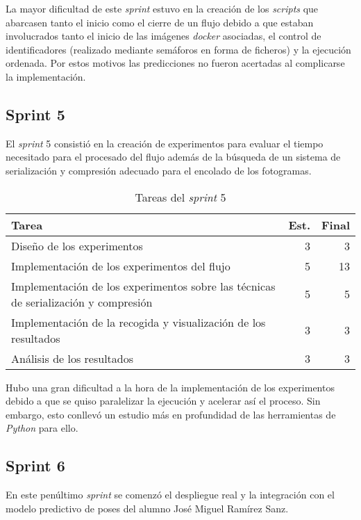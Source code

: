 La mayor dificultad de este \textit{sprint} estuvo en la creación de los \textit{scripts} que abarcasen tanto el inicio como el cierre de un flujo debido a que estaban involucrados tanto el inicio de las imágenes \textit{docker} asociadas, el control de identificadores (realizado mediante semáforos en forma de ficheros) y la ejecución ordenada. Por estos motivos las predicciones no fueron acertadas al complicarse la implementación.

\subsection{Sprint 5}

El \textit{sprint} 5 consistió en la creación de experimentos para evaluar el tiempo necesitado para el procesado del flujo además de la búsqueda de un sistema de serialización y compresión adecuado para el encolado de los fotogramas. 

\begin{table}[H]
	\begin{tabularx}{\linewidth}{X r r}
		\toprule \textbf{Tarea} & \textbf{Est.} & \textbf{Final}\\
		\toprule
		Diseño de los experimentos & 3 & 3\\
		Implementación de los experimentos del flujo & 5 & 13\\
		Implementación de los experimentos sobre las técnicas de serialización y compresión & 5 & 5\\
		Implementación de la recogida y visualización de los resultados & 3 & 3\\
		Análisis de los resultados & 3 & 3\\
		\bottomrule
	\end{tabularx}
	\caption{Tareas del \textit{sprint} 5}
	\label{tab:sprint5}
\end{table}

Hubo una gran dificultad a la hora de la implementación de los experimentos debido a que se quiso paralelizar la ejecución y acelerar así el proceso. Sin embargo, esto conllevó un estudio más en profundidad de las herramientas de \textit{Python} para ello.

\subsection{Sprint 6}

En este penúltimo \textit{sprint} se comenzó el despliegue real y la integración con el modelo predictivo de poses del alumno José Miguel Ramírez Sanz. 

